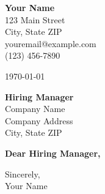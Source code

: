 \documentclass[12pt]{article}
\makeatletter
\newcommand{\yourname}{Your Name}
\newcommand{\youraddress}{123 Main Street}
\newcommand{\yourcitystatezip}{City, State ZIP}
\newcommand{\youremail}{youremail@example.com}
\newcommand{\yourphone}{(123) 456-7890}
\newcommand{\dateofletter}{\today}
\newcommand{\recipient}{Hiring Manager}
\newcommand{\companyname}{Company Name}
\newcommand{\companyaddress}{Company Address}
\newcommand{\companycitystatezip}{City, State ZIP}
\makeatother
\begin{document}
\noindent
\textbf{\yourname} \\
\youraddress \\
\yourcitystatezip \\
\youremail \\
\yourphone \\
\vspace{1em}

\noindent
\dateofletter \\
\vspace{1em}

\noindent
\textbf{\recipient} \\
\companyname \\
\companyaddress \\
\companycitystatezip \\
\vspace{2em}

\noindent
\textbf{Dear \recipient,} \\
\vspace{1em}

\noindent
\vspace{1em}

\noindent
Sincerely, \\
\vspace{2em}
\yourname
\end{document}
